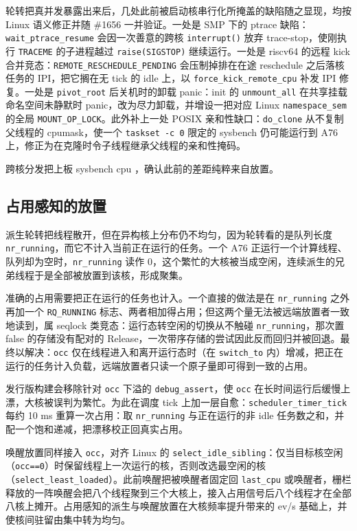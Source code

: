 轮转把真并发暴露出来后，几处此前被启动核串行化所掩盖的缺陷随之显现，均按 Linux 语义修正并随 \#1656 一并验证。一处是 SMP 下的 ptrace 缺陷：\texttt{wait\_ptrace\_resume} 会因一次善意的跨核 \texttt{interrupt()} 放弃 trace-stop，使刚执行 \texttt{TRACEME} 的子进程越过 \texttt{raise(SIGSTOP)} 继续运行。一处是 riscv64 的远程 kick 合并竞态：\texttt{REMOTE\_RESCHEDULE\_PENDING} 会压制掉排在在途 reschedule 之后落核任务的 IPI，把它搁在无 tick 的 idle 上，以 \texttt{force\_kick\_remote\_cpu} 补发 IPI 修复。一处是 \texttt{pivot\_root} 后关机时的卸载 panic：init 的 \texttt{unmount\_all} 在共享挂载命名空间未静默时 panic，改为尽力卸载，并增设一把对应 Linux \texttt{namespace\_sem} 的全局 \texttt{MOUNT\_OP\_LOCK}。此外补上一处 POSIX 亲和性缺口：\texttt{do\_clone} 从不复制父线程的 cpumask，使一个 \texttt{taskset -c 0} 限定的 sysbench 仍可能运行到 A76 上，修正为在克隆时令子线程继承父线程的亲和性掩码。

跨核分发把上板 sysbench cpu ，确认此前的差距纯粹来自放置。

\subsection{占用感知的放置}

派生轮转把线程散开，但在异构核上分布仍不均匀，因为轮转看的是队列长度 \texttt{nr\_running}，而它不计入当前正在运行的任务。一个 A76 正运行一个计算线程、队列却为空时，\texttt{nr\_running} 读作 0，这个繁忙的大核被当成空闲，连续派生的兄弟线程于是全部被放置到该核，形成聚集。

准确的占用需要把正在运行的任务也计入。一个直接的做法是在 \texttt{nr\_running} 之外再加一个 \texttt{RQ\_RUNNING} 标志、两者相加得占用；但这两个量无法被远端放置者一致地读到，属 seqlock 类竞态：运行态转空闲的切换从不触碰 \texttt{nr\_running}，那次置 false 的存储没有配对的 Release，一次带序存储的尝试因此反而回归并被回退。最终以解决：\texttt{occ} 仅在线程进入和离开运行态时（在 \texttt{switch\_to} 内）增减，把正在运行的任务计入负载，远端放置者只读一个原子量即可得到一致的占用。

发行版构建会移除针对 \texttt{occ} 下溢的 \texttt{debug\_assert}，使 \texttt{occ} 在长时间运行后缓慢上漂，大核被误判为繁忙。为此在调度 tick 上加一层自愈：\texttt{scheduler\_timer\_tick} 每约 10 ms 重算一次占用：取 \texttt{nr\_running} 与正在运行的非 idle 任务数之和，并配一个饱和递减，把漂移校正回真实占用。

唤醒放置同样接入 \texttt{occ}，对齐 Linux 的 \texttt{select\_idle\_sibling}：仅当目标核空闲（\texttt{occ==0}）时保留线程上一次运行的核，否则改选最空闲的核（\texttt{select\_least\_loaded}）。此前唤醒把被唤醒者固定回 \texttt{last\_cpu} 或唤醒者，栅栏释放的一阵唤醒会把八个线程聚到三个大核上，接入占用信号后八个线程才在全部八核上摊开。占用感知的派生与唤醒放置在大核频率提升带来的 \nLadderB{} ev/s 基础上，并使核间驻留由集中转为均匀。

